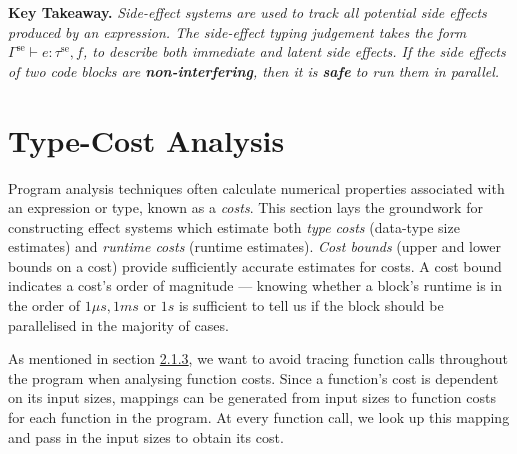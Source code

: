 \vspace{1mm}

\begin{minipage}{\textwidth}
  \begin{prooftree}
  \end{prooftree}
\end{minipage}

\addtocounter{footnote}{-1}

\vspace{4mm}
\textbf{Key Takeaway.} \textit{Side-effect systems are used to track all potential side effects produced by an expression. The side-effect typing judgement takes the form \( \Gamma^\textrm{se} \vdash e : \tau^\textrm{se}, f\), to describe both immediate and latent side effects. If the side effects of two code blocks are \textbf{non-interfering}, then it is \textbf{safe} to run them in parallel.}


\section{Type-Cost Analysis}


\label{sec:2.5}

Program analysis techniques often calculate numerical properties associated with an expression or type, known as a \textit{costs}. This section lays the groundwork for constructing effect systems which estimate both \textit{type costs} (data-type size estimates) and \textit{runtime costs} (runtime estimates). \textit{Cost bounds} (upper and lower bounds on a cost) provide sufficiently accurate estimates for costs. A cost bound indicates a cost's order of magnitude ---  knowing whether a block's runtime is in the order of \(1\mu s, 1ms\) or \(1s\) is sufficient to tell us if the block should be parallelised in the majority of cases.

As mentioned in section \hyperref[sec:2.1.3]{2.1.3}, we want to avoid tracing function calls throughout the program when analysing function costs. Since a function's cost is dependent on its input sizes, mappings can be generated from input sizes to function costs for each function in the program. At every function call, we look up this mapping and pass in the input sizes to obtain its cost.


